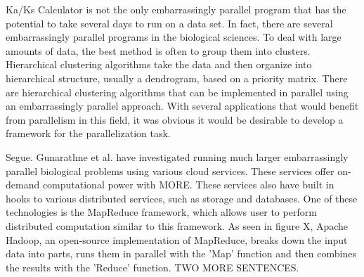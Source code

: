 \documentclass[12pt]{article}
\begin{document}
Ka/Ks Calculator is not the only embarrassingly parallel program that has the
potential to take several days to run on a data set. In fact, there are several
embarrassingly parallel programs in the biological sciences. To deal with large
amounts of data, the best method is often to group them into clusters.
Hierarchical clustering algorithms take the data and then organize into
hierarchical structure, usually a dendrogram, based on a priority matrix. There
are hierarchical clustering algorithms that can be implemented in parallel using
an embarrassingly parallel approach.  With several applications that would
benefit from parallelism in this field, it was obvious it would be desirable to
develop a framework for the  parallelization task. \cite{cluster}

Segue. Gunarathne et al.\cite{cloud} have investigated running much larger
embarrassingly parallel biological problems using various cloud services. These
services offer on-demand computational power with MORE.
These services also have built in hooks to various distributed services, such as
storage and databases. One of these technologies is the MapReduce framework,
which allows user to perform distributed computation similar to this framework.
As seen in figure X, Apache Hadoop, an open-source implementation of MapReduce,
breaks down the input data into parts, runs them in parallel with the 'Map'
function and then combines the results with the 'Reduce' function. TWO MORE
SENTENCES.
\end{document}

